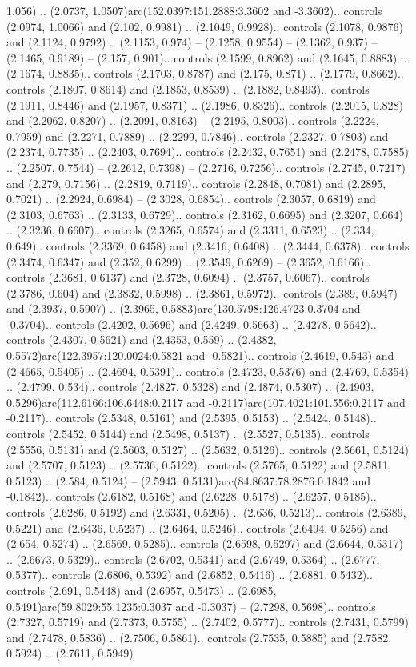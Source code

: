 1.056) .. (2.0737, 1.0507)arc(152.0397:151.2888:3.3602 and -3.3602).. controls (2.0974, 1.0066) and (2.102, 0.9981) .. (2.1049, 0.9928).. controls (2.1078, 0.9876) and (2.1124, 0.9792) .. (2.1153, 0.974) -- (2.1258, 0.9554) -- (2.1362, 0.937) -- (2.1465, 0.9189) -- (2.157, 0.901).. controls (2.1599, 0.8962) and (2.1645, 0.8883) .. (2.1674, 0.8835).. controls (2.1703, 0.8787) and (2.175, 0.871) .. (2.1779, 0.8662).. controls (2.1807, 0.8614) and (2.1853, 0.8539) .. (2.1882, 0.8493).. controls (2.1911, 0.8446) and (2.1957, 0.8371) .. (2.1986, 0.8326).. controls (2.2015, 0.828) and (2.2062, 0.8207) .. (2.2091, 0.8163) -- (2.2195, 0.8003).. controls (2.2224, 0.7959) and (2.2271, 0.7889) .. (2.2299, 0.7846).. controls (2.2327, 0.7803) and (2.2374, 0.7735) .. (2.2403, 0.7694).. controls (2.2432, 0.7651) and (2.2478, 0.7585) .. (2.2507, 0.7544) -- (2.2612, 0.7398) -- (2.2716, 0.7256).. controls (2.2745, 0.7217) and (2.279, 0.7156) .. (2.2819, 0.7119).. controls (2.2848, 0.7081) and (2.2895, 0.7021) .. (2.2924, 0.6984) -- (2.3028, 0.6854).. controls (2.3057, 0.6819) and (2.3103, 0.6763) .. (2.3133, 0.6729).. controls (2.3162, 0.6695) and (2.3207, 0.664) .. (2.3236, 0.6607).. controls (2.3265, 0.6574) and (2.3311, 0.6523) .. (2.334, 0.649).. controls (2.3369, 0.6458) and (2.3416, 0.6408) .. (2.3444, 0.6378).. controls (2.3474, 0.6347) and (2.352, 0.6299) .. (2.3549, 0.6269) -- (2.3652, 0.6166).. controls (2.3681, 0.6137) and (2.3728, 0.6094) .. (2.3757, 0.6067).. controls (2.3786, 0.604) and (2.3832, 0.5998) .. (2.3861, 0.5972).. controls (2.389, 0.5947) and (2.3937, 0.5907) .. (2.3965, 0.5883)arc(130.5798:126.4723:0.3704 and -0.3704).. controls (2.4202, 0.5696) and (2.4249, 0.5663) .. (2.4278, 0.5642).. controls (2.4307, 0.5621) and (2.4353, 0.559) .. (2.4382, 0.5572)arc(122.3957:120.0024:0.5821 and -0.5821).. controls (2.4619, 0.543) and (2.4665, 0.5405) .. (2.4694, 0.5391).. controls (2.4723, 0.5376) and (2.4769, 0.5354) .. (2.4799, 0.534).. controls (2.4827, 0.5328) and (2.4874, 0.5307) .. (2.4903, 0.5296)arc(112.6166:106.6448:0.2117 and -0.2117)arc(107.4021:101.556:0.2117 and -0.2117).. controls (2.5348, 0.5161) and (2.5395, 0.5153) .. (2.5424, 0.5148).. controls (2.5452, 0.5144) and (2.5498, 0.5137) .. (2.5527, 0.5135).. controls (2.5556, 0.5131) and (2.5603, 0.5127) .. (2.5632, 0.5126).. controls (2.5661, 0.5124) and (2.5707, 0.5123) .. (2.5736, 0.5122).. controls (2.5765, 0.5122) and (2.5811, 0.5123) .. (2.584, 0.5124) -- (2.5943, 0.5131)arc(84.8637:78.2876:0.1842 and -0.1842).. controls (2.6182, 0.5168) and (2.6228, 0.5178) .. (2.6257, 0.5185).. controls (2.6286, 0.5192) and (2.6331, 0.5205) .. (2.636, 0.5213).. controls (2.6389, 0.5221) and (2.6436, 0.5237) .. (2.6464, 0.5246).. controls (2.6494, 0.5256) and (2.654, 0.5274) .. (2.6569, 0.5285).. controls (2.6598, 0.5297) and (2.6644, 0.5317) .. (2.6673, 0.5329).. controls (2.6702, 0.5341) and (2.6749, 0.5364) .. (2.6777, 0.5377).. controls (2.6806, 0.5392) and (2.6852, 0.5416) .. (2.6881, 0.5432).. controls (2.691, 0.5448) and (2.6957, 0.5473) .. (2.6985, 0.5491)arc(59.8029:55.1235:0.3037 and -0.3037) -- (2.7298, 0.5698).. controls (2.7327, 0.5719) and (2.7373, 0.5755) .. (2.7402, 0.5777).. controls (2.7431, 0.5799) and (2.7478, 0.5836) .. (2.7506, 0.5861).. controls (2.7535, 0.5885) and (2.7582, 0.5924) .. (2.7611, 0.5949) 